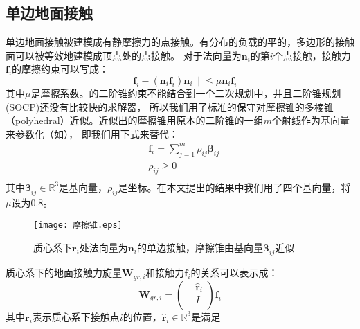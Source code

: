 \subsection{单边地面接触}
单边地面接触被建模成有静摩擦力的点接触。有分布的负载的平的，多边形的接触面可以被等效地建模成顶点处的点接触。
对于法向量为${{\boldsymbol{n}}_{i}}$的第$i$个点接触，接触力${{\boldsymbol{f}}_{i}}$的摩擦约束可以写成：
\begin{equation}
    \label{equ:friction_cone}
    \left\| {{\boldsymbol{f}}_{i}}-({{\boldsymbol{n}}_{i}}{{\boldsymbol{f}}_{i}}){{\boldsymbol{n}}_{i}} \right\|\le \mu {{\boldsymbol{n}}_{i}}{{\boldsymbol{f}}_{i}}
\end{equation}
其中$\mu$是摩擦系数。的二阶锥约束不能结合到一个二次规划中，并且二阶锥规划(SOCP)还没有比较快的求解器，
所以我们用了标准的保守对摩擦锥的多棱锥（polyhedral）近似。近似出的摩擦锥用原本的二阶锥的一组$m$个射线作为基向量来参数化（如），
即我们用下式来替代：
\begin{equation}
    \label{equ:friction_para}
    \begin{aligned}
        & {{\boldsymbol{f}}_{i}}=\sum\limits_{j=1}^{m}{{{\rho }_{ij}}{{\boldsymbol{\beta}}_{ij}}} \\ 
       & {{\rho }_{ij}}\ge 0 \\ 
      \end{aligned}      
\end{equation}
其中$\boldsymbol{\beta}_{ij} \in \mathbb{R}^3$是基向量，$\rho_{ij}$是坐标。在本文提出的结果中我们用了四个基向量，将$\mu$设为0.8。
\begin{figure}[htbp]
    \centering
    \texttt{[image: 摩擦锥.eps]}
    \caption{\label{fig:friction_cone}质心系下$\boldsymbol{r}_{i}$处法向量为${{\boldsymbol{n}}_{i}}$的单边接触，摩擦锥由基向量$\boldsymbol{\beta}_{ij}$近似}
\end{figure}
质心系下的地面接触力旋量${{\boldsymbol{W}}_{gr,i}}$和接触力${{\boldsymbol{f}}_{i}}$的关系可以表示成：
\begin{equation}
    \label{equ:contact_wrench}
    {\boldsymbol{W}_{gr,i}}=\left( \begin{aligned}
        & {{{\hat{\boldsymbol{r}}}}_{i}} \\ 
       & I \\ 
      \end{aligned} \right){\boldsymbol{f}_{i}}      
\end{equation}
其中${\boldsymbol{r}_{i}}$表示质心系下接触点$i$的位置，${{\hat{\boldsymbol{r}}}_{i}}\in {{\mathbb{R}}^{3}}$是满足
